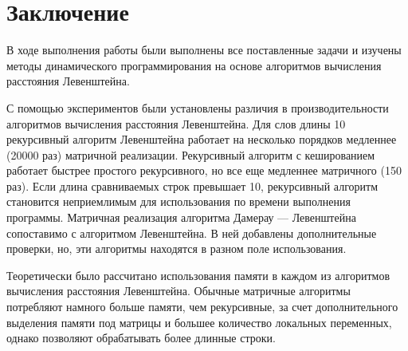 \chapter*{Заключение}

В ходе выполнения работы были выполнены все поставленные задачи и изучены методы динамического программирования на основе алгоритмов вычисления расстояния Левенштейна.

С помощью экспериментов были установлены различия в производительности алгоритмов вычисления расстояния Левенштейна. Для слов длины 10 рекурсивный алгоритм Левенштейна работает на несколько порядков медленнее (20000 раз) матричной реализации. Рекурсивный алгоритм с кешированием работает быстрее простого рекурсивного, но все еще медленнее матричного (150 раз). Если длина сравниваемых строк превышает 10, рекурсивный алгоритм становится неприемлимым для использования по времени выполнения программы. Матричная реализация алгоритма Дамерау — Левенштейна сопоставимо с алгоритмом Левенштейна. В ней добавлены дополнительные проверки, но, эти алгоритмы находятся в разном поле использования.

Теоретически было рассчитано использования памяти в каждом из алгоритмов вычисления расстояния Левенштейна. Обычные матричные алгоритмы потребляют намного больше памяти, чем рекурсивные, за счет дополнительного выделения памяти под матрицы и большее количество локальных переменных, однако позволяют обрабатывать более длинные строки.